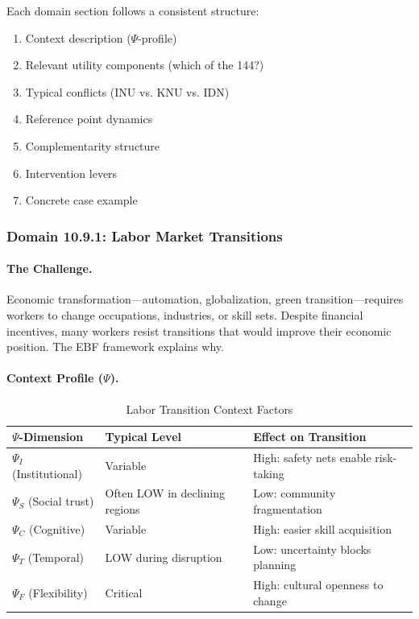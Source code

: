 Each domain section follows a consistent structure:
\begin{enumerate}
\item Context description ($\Psi$-profile)
\item Relevant utility components (which of the 144?)
\item Typical conflicts (INU vs. KNU vs. IDN)
\item Reference point dynamics
\item Complementarity structure
\item Intervention levers
\item Concrete case example
\end{enumerate}

\subsubsection{Domain 10.9.1: Labor Market Transitions}
\label{subsubsec:labor-transitions}

\paragraph{The Challenge.}
Economic transformation---automation, globalization, green transition---requires
workers to change occupations, industries, or skill sets. Despite financial
incentives, many workers resist transitions that would improve their economic
position. The EBF framework explains why.

\paragraph{Context Profile ($\Psi$).}

\begin{table}[htbp]
\centering
\caption{Labor Transition Context Factors}
\label{tab:labor-psi}
\renewcommand{\arraystretch}{1.3}
\begin{tabular}{@{}lll@{}}
\toprule
\textbf{$\Psi$-Dimension} & \textbf{Typical Level} & \textbf{Effect on Transition} \\
\midrule
$\Psi_I$ (Institutional) & Variable & High: safety nets enable risk-taking \\
$\Psi_S$ (Social trust) & Often LOW in declining regions & Low: community fragmentation \\
$\Psi_C$ (Cognitive) & Variable & High: easier skill acquisition \\
$\Psi_T$ (Temporal) & LOW during disruption & Low: uncertainty blocks planning \\
$\Psi_F$ (Flexibility) & Critical & High: cultural openness to change \\
\bottomrule
\end{tabular}
\end{table}

